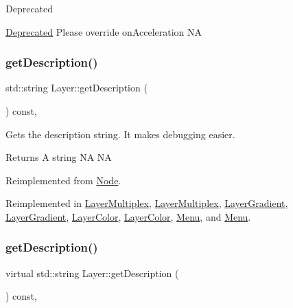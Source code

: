 \begin{DoxyRefDesc}{Deprecated}
\item[\hyperlink{deprecated__deprecated000256}{Deprecated}]Please override on\+Acceleration  NA \end{DoxyRefDesc}
\mbox{\label{classLayer_acadcdf383e0bf892c95213a4f7725672}} 
\subsubsection{\texorpdfstring{get\+Description()}{getDescription()}\hspace{0.1cm}{\footnotesize\ttfamily [1/2]}}
{\footnotesize\ttfamily std\+::string Layer\+::get\+Description (\begin{DoxyParamCaption}{ }\end{DoxyParamCaption}) const\hspace{0.3cm}{\ttfamily [override]}, {\ttfamily [virtual]}}

Gets the description string. It makes debugging easier. \begin{DoxyReturn}{Returns}
A string  NA  NA 
\end{DoxyReturn}


Reimplemented from \hyperlink{classNode_a41710375a0d92a4ee54c39fe123b5912}{Node}.



Reimplemented in \hyperlink{classLayerMultiplex_ab87bcf38601d2ef54325b95e22565d31}{Layer\+Multiplex}, \hyperlink{classLayerMultiplex_a60e44b51edd0e10a3601bf5e5094c30d}{Layer\+Multiplex}, \hyperlink{classLayerGradient_ace9ed0ed0422bdc89a7e440a9f8307d3}{Layer\+Gradient}, \hyperlink{classLayerGradient_a95a281f25e6c4196664e9866e451fcc2}{Layer\+Gradient}, \hyperlink{classLayerColor_a363da7455314bdf8a5fd4f809e70796e}{Layer\+Color}, \hyperlink{classLayerColor_aae6932d9d9e0ae21cc34e1e37d0b2d92}{Layer\+Color}, \hyperlink{classMenu_ac8ea6b6d3296f7c973e1d82051425afe}{Menu}, and \hyperlink{classMenu_a2f8bee450bcae21f9d5f27941467ff59}{Menu}.

\mbox{\label{classLayer_ac35b850bd512fae372643e3217083260}} 
\subsubsection{\texorpdfstring{get\+Description()}{getDescription()}\hspace{0.1cm}{\footnotesize\ttfamily [2/2]}}
{\footnotesize\ttfamily virtual std\+::string Layer\+::get\+Description (\begin{DoxyParamCaption}{ }\end{DoxyParamCaption}) const\hspace{0.3cm}{\ttfamily [override]}, {\ttfamily [virtual]}}


